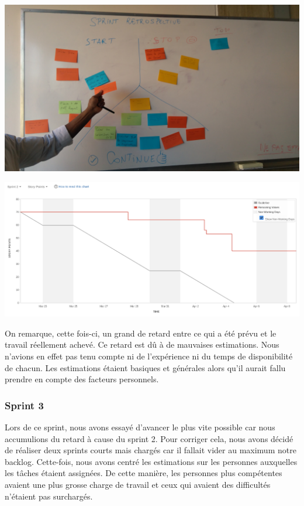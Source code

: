 \documentclass[t, 12pt, usenames,dvipsnames]{article}
\begin{document}
                \begin{center}                               
                    \includegraphics[scale=.1]{images/sprint/sprint-retro.jpg}
                    \label{fig:sprint1_graph}
                \end{center}

                \begin{center}
                    \includegraphics[scale=.25]{images/graph-new/sprint2.png}
                    \label{fig:sprint2_graph}
                \end{center}

                \noindent On remarque, cette fois-ci, un grand de retard entre ce qui a été prévu et le travail réellement achevé. Ce retard est dû à de mauvaises estimations. Nous n'avions en effet pas tenu compte ni de l'expérience ni du temps de disponibilité de chacun. Les estimations étaient basiques et générales alors qu'il aurait fallu prendre en compte des facteurs personnels.


            \subsubsection{Sprint 3}
                \noindent Lors de ce sprint, nous avons essayé d'avancer le plus vite possible car nous accumulions du retard à cause du sprint 2. Pour corriger cela, nous avons décidé de réaliser deux sprints courts mais chargés car il fallait vider au maximum notre backlog.
                Cette-fois, nous avons centré les estimations sur les personnes auxquelles les tâches étaient assignées. De cette manière, les personnes plus compétentes avaient une plus grosse charge de travail et ceux qui avaient des difficultés n'étaient pas surchargés.
                
\end{document}
